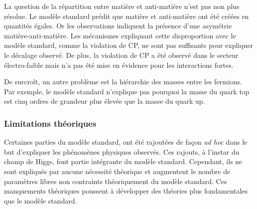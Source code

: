   \medskip
  
  La question de la r\'epartition entre mati\`ere et anti-mati\`ere n'est pas non plus r\'esolue. Le mod\`ele standard pr\'edit que mati\`ere et anti-mati\`ere ont \'et\'e cr\'e\'ees en quantit\'es \'egales. Or les observations indiquent la pr\'esence d'une asym\'etrie mati\`ere-anti-mati\`ere. Les m\'ecanismes expliquant cette disproportion avec le mod\`ele standard, comme la violation de CP, ne sont pas suffisants pour expliquer le d\'ecalage observ\'e. De plus, la violation de CP a \'et\'e observ\'e dans le secteur \'electro-faible mais n'a pas \'et\'e mise en \'evidence pour les interactions fortes. 
  
  \medskip
  
  De surcro\^it, un autre probl\`eme est la hi\'erarchie des masses entre les fermions. Par exemple, le mod\`ele standard n'explique pas pourquoi la masse du quark top est cinq ordres de grandeur plus \'elev\'ee que la masse du quark up.
  
  \subsubsection{Limitations th\'eoriques}
  
  Certaines parties du mod\`ele standard, ont \'et\'e rajout\'ees de façon \textit{ad hoc} dans le but d'expliquer les ph\'enom\`enes physiques observ\'es. Ces rajouts, \`a l'instar du champ de Higgs, font partie int\'egrante du mod\`ele standard. Cependant, ils ne sont expliqu\'es par aucune n\'ecessité th\'eorique et augmentent le nombre de param\`etres libres non contraints th\'eoriquement du mod\`ele standard. Ces manquements th\'eoriques poussent \`a d\'evelopper des th\'eories plus fondamentales que le mod\`ele standard.
  
  \medskip
  
